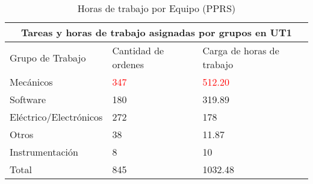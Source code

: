             \begin{table}[H]
                \centering
                \caption{Horas de trabajo por Equipo (PPRS)}
                \label{tab:PPRStimes}
                \begin{tabular}{|l|l|l|}
                \hline
                \multicolumn{3}{|c|}{Tareas y horas de trabajo asignadas por grupos en UT1}       \\ \hline \hline
                Grupo de Trabajo       & Cantidad de ordenes      & Carga de horas de trabajo   \\ \hline
                Mecánicos              & \textcolor{red}{347}   &\textcolor{red}{512.20} \\ \hline
                Software               & 180                      & 319.89                      \\ \hline
                Eléctrico/Electrónicos & 272                      & 178                         \\ \hline
                Otros                  & 38                       & 11.87                       \\ \hline
                Instrumentación        & 8                        & 10                          \\ \hline
                Total                  & 845                      & 1032.48 \\ \hline                   
                \end{tabular}
            \end{table}
            
